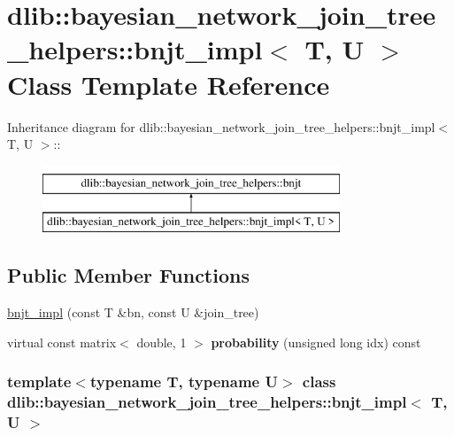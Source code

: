 \hypertarget{classdlib_1_1bayesian__network__join__tree__helpers_1_1bnjt__impl}{
\section{dlib::bayesian\_\-network\_\-join\_\-tree\_\-helpers::bnjt\_\-impl$<$ T, U $>$ Class Template Reference}
\label{classdlib_1_1bayesian__network__join__tree__helpers_1_1bnjt__impl}
}
Inheritance diagram for dlib::bayesian\_\-network\_\-join\_\-tree\_\-helpers::bnjt\_\-impl$<$ T, U $>$::\begin{figure}[H]
\begin{center}
\leavevmode
\includegraphics[height=2cm]{classdlib_1_1bayesian__network__join__tree__helpers_1_1bnjt__impl}
\end{center}
\end{figure}
\subsection*{Public Member Functions}
\begin{DoxyCompactItemize}
\item 
\hyperlink{classdlib_1_1bayesian__network__join__tree__helpers_1_1bnjt__impl_a5e845b2196c0ebddd50c919a1d62ce9a}{bnjt\_\-impl} (const T \&bn, const U \&join\_\-tree)
\item 
\hypertarget{classdlib_1_1bayesian__network__join__tree__helpers_1_1bnjt__impl_a63828a5e8f9e7501b03bc242ba276d01}{
virtual const matrix$<$ double, 1 $>$ {\bfseries probability} (unsigned long idx) const }
\label{classdlib_1_1bayesian__network__join__tree__helpers_1_1bnjt__impl_a63828a5e8f9e7501b03bc242ba276d01}

\end{DoxyCompactItemize}
\subsubsection*{template$<$typename T, typename U$>$ class dlib::bayesian\_\-network\_\-join\_\-tree\_\-helpers::bnjt\_\-impl$<$ T, U $>$}



